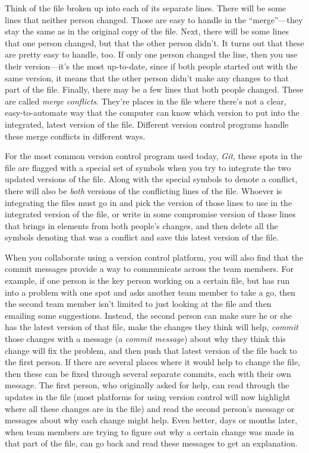 \documentclass[]{tufte-book}
\begin{document}
Think of the file broken up into each of its separate lines. There will be some
lines that neither person changed. Those are easy to handle in the
``merge''---they stay the same as in the original copy of the file. Next, there
will be some lines that one person changed, but that the other person didn't. It
turns out that these are pretty easy to handle, too. If only one person changed
the line, then you use their version---it's the most up-to-date, since if both
people started out with the same version, it means that the other person didn't
make any changes to that part of the file. Finally, there may be a few lines
that both people changed. These are called \emph{merge conflicts}. They're places in
the file where there's not a clear, easy-to-automate way that the computer can
know which version to put into the integrated, latest version of the file.
Different version control programs handle these merge conflicts in different
ways.

For the most common version control program used today, \emph{Git}, these spots in
the file are flagged with a special set of symbols when you try to integrate the
two updated versions of the file. Along with the special symbols to denote a
conflict, there will also be \emph{both} versions of the conflicting lines of the
file. Whoever is integrating the files must go in and pick the version of those
lines to use in the integrated version of the file, or write in some compromise
version of those lines that brings in elements from both people's changes, and
then delete all the symbols denoting that was a conflict and save this latest
version of the file.

When you collaborate using a version control platform, you will also find that
the commit messages provide a way to communicate across the team members. For
example, if one person is the key person working on a certain file, but has run
into a problem with one spot and asks another team member to take a go, then the
second team member isn't limited to just looking at the file and then emailing
some suggestions. Instead, the second person can make sure he or she has the
latest version of that file, make the changes they think will help,
\emph{commit} those changes with a message (a \emph{commit message}) about why they think
this change will fix the problem, and then push that latest version of the file
back to the first person. If there are several places where it would help to
change the file, then these can be fixed through several separate commits, each
with their own message. The first person, who originally asked for help, can
read through the updates in the file (most platforms for using version control
will now highlight where all these changes are in the file) and read the second
person's message or messages about why each change might help. Even better, days
or months later, when team members are trying to figure out why a certain change
was made in that part of the file, can go back and read these messages to get an
explanation.
\end{document}
